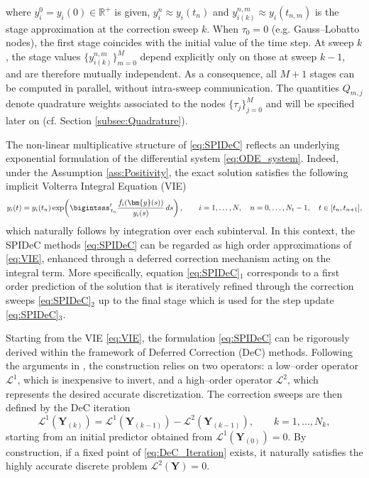 \documentclass[a4paper,num-refs]{oup-contemporary-spidec}
\begin{document}
where $y_i^0=y_i(0)\in \mathbb{R}^+$ is given, $y_i^n\approx y_i(t_n)$ and $y_{i(k)}^{n,m}\approx y_i(t_{n,m})$ is the stage approximation at the correction sweep $k.$ When $\tau_0=0$ (e.g. Gauss--Lobatto nodes), the first stage coincides with the initial value of the time step. At sweep $k$, the stage values $\{y^{n,m}_{i(k)}\}_{m=0}^M$ depend explicitly only on those at sweep $k-1$, and are therefore mutually independent. As a consequence, all $M+1$ stages can be computed in parallel, without intra-sweep communication.  The quantities $Q_{m,j}$ denote quadrature weights associated to the nodes $\{\tau_j\}_{j=0}^M$ and will be specified later on (cf. Section \ref{subsec:Quadrature}). 

The non-linear multiplicative structure of \eqref{eq:SPIDeC} reflects an underlying exponential formulation of the differential system \eqref{eq:ODE_system}. Indeed, under the Assumption  \ref{ass:Positivity}, the exact solution satisfies the following implicit Volterra Integral Equation (VIE) 
\begin{equation}\label{eq:VIE}
    y_i(t) = y_i(t_n)
    \exp\!\left(
    \bigintsss_{\, t_n}^{t}
    \dfrac{f_i(\bm{y}(s))}{y_i(s)}\, ds\right), \qquad i=1,\dots,N, \quad n=0,\dots,N_t-1, \quad t \in [t_n,t_{n+1}],
\end{equation}
which naturally follows by integration over each subinterval. In this context, the SPIDeC methods \eqref{eq:SPIDeC} can be regarded as high order approximations of \eqref{eq:VIE}, enhanced through a deferred correction mechanism acting on the integral term. More specifically, equation \eqref{eq:SPIDeC}$_1$ corresponds to a first order prediction of the solution that is iteratively refined through the correction sweeps \eqref{eq:SPIDeC}$_2$ up to the final stage which is used for the step update \eqref{eq:SPIDeC}$_3$. %

Starting from the VIE \eqref{eq:VIE}, the formulation \eqref{eq:SPIDeC} can be rigorously derived within
the framework of Deferred Correction (DeC) methods. Following the arguments in \cite{Abgrall_2017}, the
construction relies on two operators: a low–order operator
$\bm{\mathcal L}^1$, which is inexpensive to invert, and a high–order operator $\bm{\mathcal L}^2$, which represents the desired accurate discretization. The correction sweeps are then defined by the DeC iteration
\begin{equation}\label{eq:DeC_Iteration}
    \bm{\mathcal L}^1(\bm Y_{(k)}) =\bm{\mathcal L}^1(\bm Y_{(k-1)})-\bm{\mathcal L}^2(\bm Y_{(k-1)}), \qquad k=1,\dots,N_k ,
\end{equation}
starting from an initial predictor obtained from
$\bm{\mathcal L}^1(\bm Y_{(0)})=0$. By construction, if a fixed point of \eqref{eq:DeC_Iteration} exists, it naturally satisfies the highly accurate discrete problem $\bm{\mathcal L}^2(\bm Y)=0$.
\end{document}
